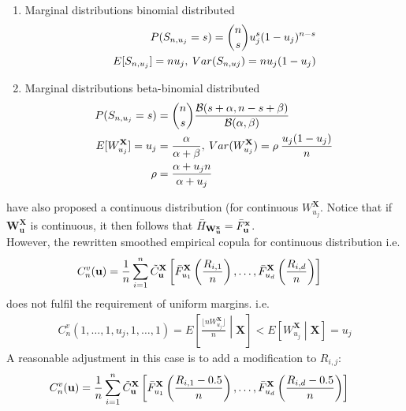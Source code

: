 \documentclass[12pt]{report}
\newcommand{\1}{\mathbf{1}}
\begin{document}
\begin{flushleft}
\begin{enumerate}

\item Marginal distributions binomial distributed
\begin{align*}
P ( S_{n,u_{j}} = s) = \dbinom{n}{s} u_{j}^{s} (1 - u_{j}) ^ {n - s} \\
E[S_{n,u_{j}}] = n u_{j}, \: Var(S_{n,u{j}}) = n u_{j} (1 - u_{j})
\end{align*}

\item Marginal distributions beta-binomial distributed
\begin{align*}
P ( S_{n,u_{j}} = s) &= \dbinom{n}{s} \frac{\mathcal{B}(s + \alpha, n - s + \beta)}{\mathcal{B}(\alpha,\beta)} \\
E[W^{\textbf{X}}_{u_{j}}] = u_{j} &= \frac{\alpha}{\alpha + \beta}, \: Var(W^{\textbf{X}}_{u_{j}}) = \rho \: \frac{u_{j} (1 - u_{j})}{n} \\
\rho &= \frac{\alpha + u_{j}n}{\alpha + u_{j}}
\end{align*}
\end{enumerate}
\cite{KojadinovicYi2024Smooth} have also proposed a continuous distribution (for continuous $W^{\textbf{X}}_{u_{j}}$. Notice that if $\mathbf{W^{X}_{u}}$ is continuous, it then follows that $\Bar{H}_{\mathbf{W^{x}_{u}}} = \Bar{F}^{\textbf{x}}_{\textbf{u}}$. \\
\vspace{0.5cm}
However, the rewritten smoothed empirical copula for continuous distribution i.e.
\begin{align*}
C_{n}^{v}(\textbf{u}) &= \frac{1}{n} \sum\limits_{i = 1}^{n} \Tilde{C}_{\textbf{u}}^{\textbf{X}} \left[\Bar{F}_{u_{1}}^{\textbf{X}}\left(\frac{R_{i,1}}{n}\right), \dots, \Bar{F}_{u_{d}}^{\textbf{X}}\left(\frac{R_{i,d}}{n}\right) \right]
\end{align*}
does not fulfil the requirement of uniform margins. i.e. 
\begin{align*}
C_{n}^{v}(1, \dots, 1, u_{j}, 1, \dots, 1) = E \left[ \frac{\lfloor nW^{\textbf{X}}_{u_{j}} \rfloor}{n} \middle| \textbf{X} \right] < E \left[ W^{\textbf{X}}_{u_{j}} \middle| \textbf{X} \right] = u_{j}
\end{align*}
A reasonable adjustment in this case is to add a modification to $R_{i,j}$:
\begin{align*}
C_{n}^{v}(\textbf{u}) &= \frac{1}{n} \sum\limits_{i = 1}^{n} \Tilde{C}_{\textbf{u}}^{\textbf{X}} \left[\Bar{F}_{u_{1}}^{\textbf{X}}\left(\frac{R_{i,1} - 0.5}{n}\right), \dots, \Bar{F}_{u_{d}}^{\textbf{X}}\left(\frac{R_{i,d} - 0.5}{n}\right) \right]
\end{align*}


\end{flushleft}
\end{document}
